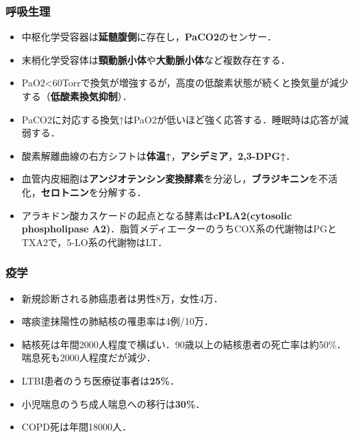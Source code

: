 \subsubsection{呼吸生理}
\begin{itemize}

\item 中枢化学受容器は\textbf{延髄腹側}に存在し，\textbf{PaCO2}のセンサー．
\item 末梢化学受容体は\textbf{頸動脈小体}や\textbf{大動脈小体}など複数存在する．
\item PaO2<60Torrで換気が増強するが，高度の低酸素状態が続くと換気量が減少する（\textbf{低酸素換気抑制}）．
\item PaCO2に対応する換気↑はPaO2が低いほど強く応答する．睡眠時は応答が減弱する．
\item 酸素解離曲線の右方シフトは\textbf{体温↑}，\textbf{アシデミア}，\textbf{2,3-DPG↑}．

\item 血管内皮細胞は\textbf{アンジオテンシン変換酵素}を分泌し，\textbf{ブラジキニン}を不活化，\textbf{セロトニン}を分解する．
\item アラキドン酸カスケードの起点となる酵素は\textbf{cPLA2(cytosolic phospholipase A2)}．脂質メディエーターのうちCOX系の代謝物はPGとTXA2で，5-LO系の代謝物はLT．

\end{itemize}


\subsubsection{疫学}
\begin{itemize}
\item 新規診断される肺癌患者は男性8万，女性4万．
\item 喀痰塗抹陽性の肺結核の罹患率は4例/10万．
\item 結核死は年間2000人程度で横ばい．90歳以上の結核患者の死亡率は約50\%．喘息死も2000人程度だが減少．
\item LTBI患者のうち医療従事者は\textbf{25\%}．
\item 小児喘息のうち成人喘息への移行は\textbf{30\%}．
\item COPD死は年間18000人．


\end{itemize}

